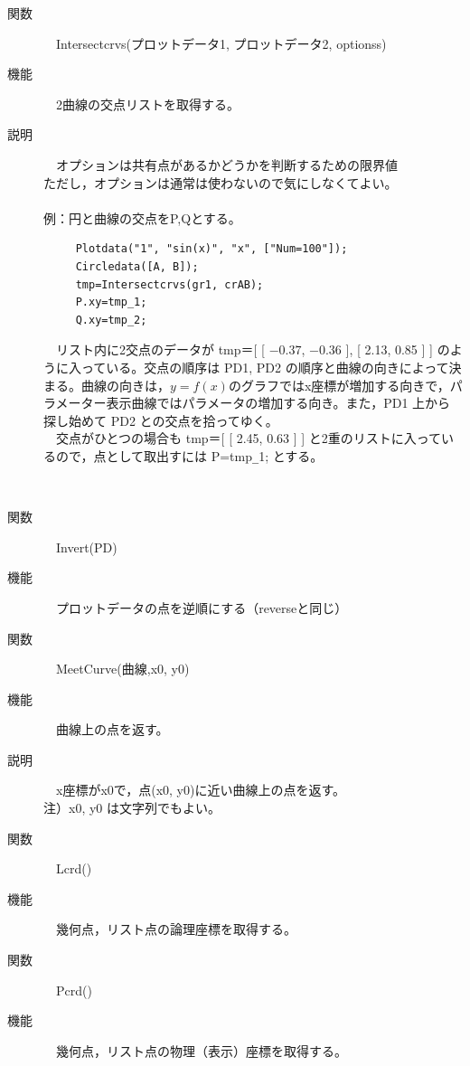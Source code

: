 \documentclass[papersize,a4paper,12pt,uplatex]{jsarticle}
\begin{document}
\begin{description}
\hypertarget{intersectcrvs}{}
\item[関数]　Intersectcrvs(プロットデータ1, プロットデータ2, optionss)
\item[機能]　2曲線の交点リストを取得する。
\item[説明]　オプションは共有点があるかどうかを判断するための限界値\\
ただし，オプションは通常は使わないので気にしなくてよい。\\
　\\
例：円と曲線の交点をP,Qとする。
\begin{verbatim}
　　　Plotdata("1", "sin(x)", "x", ["Num=100"]);
　　　Circledata([A, B]);
　　　tmp=Intersectcrvs(gr1, crAB);
　　　P.xy=tmp_1;
　　　Q.xy=tmp_2;
 \end{verbatim}
    
　リスト内に2交点のデータが tmp＝[ [ $-0.37$, $-0.36$ ], [ 2.13, 0.85 ] ] のように入っている。交点の順序は PD1, PD2 の順序と曲線の向きによって決まる。曲線の向きは，$y=f(x)$のグラフではx座標が増加する向きで，パラメーター表示曲線ではパラメータの増加する向き。また，PD1 上から探し始めて PD2 との交点を拾ってゆく。\\
　交点がひとつの場合も tmp＝[ [ 2.45, 0.63 ] ] と2重のリストに入っているので，点として取出すには P=tmp\verb|_|1; とする。\\
\begin{center}
\\
\end{center}

\hypertarget{invert}{}
\item[関数]　Invert(PD)
\item[機能]　プロットデータの点を逆順にする（reverseと同じ）
\\

\hypertarget{meetcurve}{}
\item[関数]　MeetCurve(曲線,x0, y0)
\item[機能]　曲線上の点を返す。
\item[説明]　x座標がx0で，点(x0, y0)に近い曲線上の点を返す。\\
注）x0, y0 は文字列でもよい。\\

\hypertarget{lcrd}{}
\item[関数]　Lcrd()
\item[機能]　幾何点，リスト点の論理座標を取得する。
\\

\hypertarget{pcrd}{}
\item[関数]　Pcrd()
\item[機能]　幾何点，リスト点の物理（表示）座標を取得する。
\\



\end{description}
\end{document}
